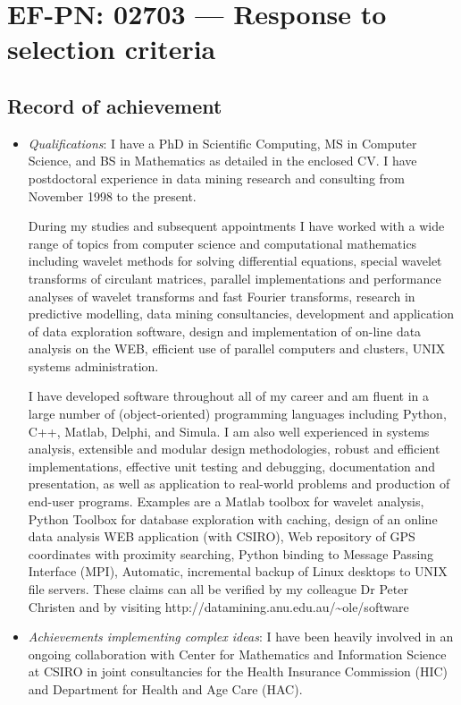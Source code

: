 \documentclass[12pt,a4paper]{article}
\begin{document}
\section*{EF-PN: 02703 --- Response to selection criteria}

\subsection*{Record of achievement}
\begin{itemize}
  \item \textit{Qualifications}:
  I have a PhD in Scientific Computing, MS in Computer Science,
  and BS in Mathematics as detailed in the enclosed CV.
  I have postdoctoral experience in data mining research and consulting
  from November 1998 to the present.

  During my studies and subsequent appointments I have worked with
  a wide range of topics from computer science and computational mathematics
  including wavelet methods for solving differential equations, 
  special wavelet transforms of circulant matrices, 
  parallel implementations and performance 
  analyses of wavelet transforms and fast Fourier transforms, 
  research in predictive modelling, data mining consultancies, 
  development and application of data exploration software, 
  design and implementation of on-line data analysis on the WEB, 
  efficient use of parallel computers and clusters,
  UNIX systems administration.
  
  I have developed software throughout all of my career
  and am fluent in a large number of 
  (object-oriented) programming languages including
  Python, C++, Matlab, Delphi, and Simula. 
  I am also well experienced in 
  systems analysis, extensible and modular design methodologies, 
  robust and efficient implementations, effective unit testing and debugging, 
  documentation and presentation, as well as application to real-world
  problems and production of end-user programs.
  Examples are a Matlab toolbox for wavelet analysis, 
  Python Toolbox for database exploration with caching, 
  design of an online data analysis WEB application (with CSIRO),  
  Web repository of GPS coordinates with proximity searching,
  Python binding to Message Passing Interface (MPI),
  Automatic, incremental backup of Linux desktops to UNIX file servers. 
  These claims can all be verified by my colleague Dr Peter Christen
  and by visiting http://datamining.anu.edu.au/\~{}ole/software
    
  \item \textit{Achievements implementing complex ideas}: 
    I have been heavily involved in an ongoing collaboration 
    with Center for Mathematics and Information Science at CSIRO
    in joint consultancies for the Health Insurance Commission (HIC)
    and Department for Health and Age Care (HAC). 


\end{itemize}
\end{document}
